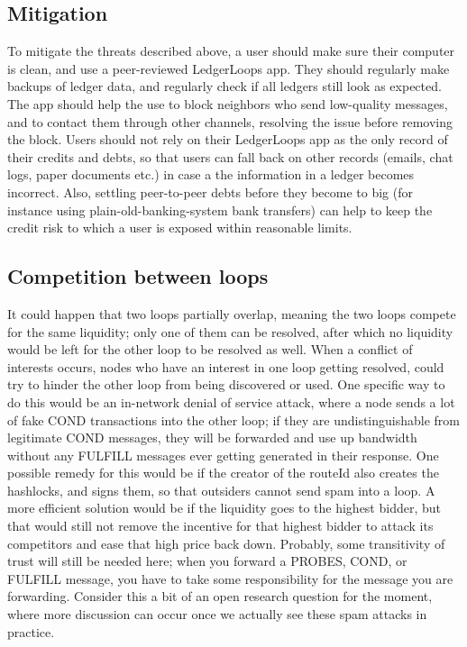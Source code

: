 \documentclass[11pt,twoside,a4paper]{article}
\begin{document}
\subsection{Mitigation}
To mitigate the threats described above, a user should make sure their computer is clean, and use a peer-reviewed LedgerLoops app.
They should regularly make backups of ledger data, and regularly check if all ledgers still look as expected.
The app should help the use to block neighbors who send low-quality messages, and to contact them through other channels, resolving the issue before removing the block.
Users should not rely on their LedgerLoops app as the only record of their credits and debts, so that users can fall back on other records (emails, chat logs, paper documents etc.) in case a the information in a ledger becomes incorrect. Also, settling peer-to-peer debts before they become to big (for instance using plain-old-banking-system bank transfers) can help to keep the credit risk to which a user is exposed within reasonable limits.

\subsection{Competition between loops}
It could happen that two loops partially overlap, meaning the two loops compete for the same liquidity; only one of them can be resolved, after which no liquidity would be left for the other loop to be resolved as well. When a conflict of interests occurs, nodes who have an interest in one loop getting resolved, could try to hinder the other loop from being discovered or used. One specific way to do this would be an in-network denial of service attack, where a node sends a lot of fake COND transactions into the other loop; if they are undistinguishable from legitimate COND messages, they will be forwarded and use up bandwidth without any FULFILL messages ever getting generated in their response. One possible remedy for this would be if the creator of the routeId also creates the hashlocks, and signs them, so that outsiders cannot send spam into a loop. A more efficient solution would be if the liquidity goes to the highest bidder, but that would still not remove the incentive for that highest bidder to attack its competitors and ease that high price back down. Probably, some transitivity of trust will still be needed here; when you forward a PROBES, COND, or FULFILL message, you have to take some responsibility for the message you are forwarding. Consider this a bit of an open research question for the moment, where more discussion can occur once we actually see these spam attacks in practice.
\end{document}
